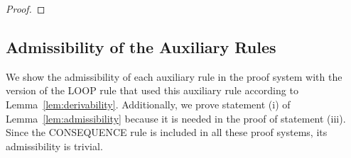 \documentclass[manuscript, screen, review]{acmart}
\begin{document}
\begin{proof}

\end{proof}



\subsection{Admissibility of the Auxiliary Rules}
\label{subsec:proof-admissibility}

We show the admissibility of each auxiliary rule in the proof system
with the version of the LOOP rule that used this auxiliary rule 
according to Lemma~\ref{lem:derivability}. 
Additionally, we prove statement (i) of Lemma~\ref{lem:admissibility} 
because it is needed in the proof of statement (iii).
Since the CONSEQUENCE rule is included in all these proof systems,
its admissibility is trivial.
\end{document}
